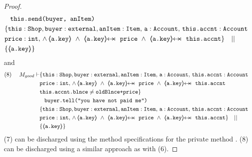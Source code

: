 \begin{proof}
\begin{align*}
		  		&\;\;\; \prg{this.send(buyer, anItem)}\ \\  
		  		& \{  \prg{this}:\prg{Shop}, \prg{buyer} : \prg{external}, \prg{anItem} : \prg{Item},\, \prg{a}:\prg{Account},\, \prg{this.accnt}:\prg{Account}\\
				& \prg{price} : \prg{int},\,
				  \wedge\, 
				  {\inside{\prg{a.key}}}\ \wedge\ 
				  \protectedFrom{\prg{a.key}}{\prg{price}}\ \wedge\ 
				   \protectedFrom{\prg{a.key}}{\prg{this.accnt}}\} \ \ \  || \ \ \ \\
		  		& \{ {\inside{\prg{a.key}}} \}
\end{align*}
\normalsize
and 
\small
\begin{align*}
\text{(8)}  \ \ \ \ M_{good} \vdash & \{  \prg{this}:\prg{Shop}, \prg{buyer} : \prg{external}, \prg{anItem} : \prg{Item},\, \prg{a}:\prg{Account},\, \prg{this.accnt}:\prg{Account}\\
				& \prg{price} : \prg{int},\,
				  \wedge\, 
				  {\inside{\prg{a.key}}}\ \wedge\ 
				  \protectedFrom{\prg{a.key}}{\prg{price}}\ \wedge\ 
				   \protectedFrom{\prg{a.key}}{\prg{this.accnt}} \\
				& \prg{this.accnt.blnce} \neq \prg{oldBlnce+price}\} \\
		  		&\;\;\; \prg{buyer.tell("you have not paid me")}\ \\  
		  		& \{  \prg{this}:\prg{Shop}, \prg{buyer} : \prg{external}, \prg{anItem} : \prg{Item},\, \prg{a}:\prg{Account},\, \prg{this.accnt}:\prg{Account}\\
				& \prg{price} : \prg{int},\,
				  \wedge\, 
				  {\inside{\prg{a.key}}}\ \wedge\ 
				  \protectedFrom{\prg{a.key}}{\prg{price}}\ \wedge\ 
				   \protectedFrom{\prg{a.key}}{\prg{this.accnt}}\} \ \ \  || \ \ \ \\
		  		& \{ {\inside{\prg{a.key}}} \}
\end{align*}
\normalsize
(7) can be discharged using the method specifications for the private method . (8) can be discharged using a similar approach as with (6).


\end{proof}
